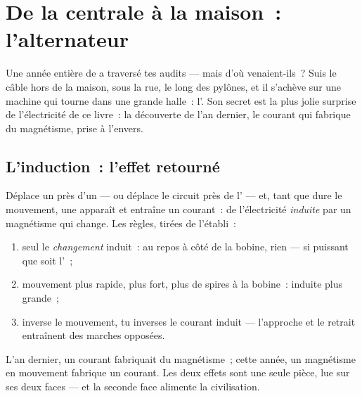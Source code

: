 \chapter{De la centrale à la maison~: l'alternateur}\label{ch:g9:alternator}

Une année entière de  a traversé tes audits --- mais
d'où venaient-ils~? Suis le câble hors de la maison, sous la rue, le
long des pylônes, et il s'achève sur une machine qui tourne dans une
grande halle~: l'. Son secret est la plus jolie surprise de
l'électricité de ce livre~: la découverte de l'an dernier, le courant
qui fabrique du magnétisme, prise à l'envers.

\section{L'induction~: l'effet retourné}

\begin{proposition}\label{prop:g9:alternator:induction}
Déplace un  près d'un  --- ou déplace le circuit
près de l' --- et, tant que dure le mouvement, une 
apparaît et entraîne un courant~: de l'électricité \emph{induite} par
un magnétisme qui change. Les règles, tirées de l'établi~:
\begin{enumerate}
  \item seul le \emph{changement} induit~:  au repos à côté
        de la bobine, rien --- si puissant que soit l'~;
  \item mouvement plus rapide,  plus fort, plus de spires à
        la bobine~:  induite plus grande~;
  \item inverse le mouvement, tu inverses le courant induit ---
        l'approche et le retrait entraînent des marches opposées.
\end{enumerate}
L'an dernier, un courant fabriquait du magnétisme~; cette année, un
magnétisme en mouvement fabrique un courant. Les deux effets sont une
seule pièce, lue sur ses deux faces --- et la seconde face alimente la
civilisation.
\end{proposition}


